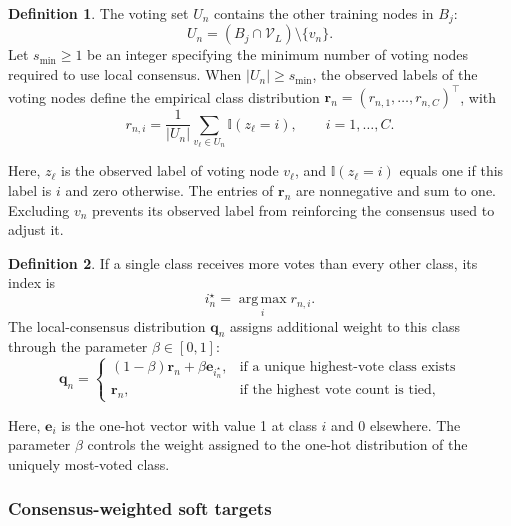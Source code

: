 \documentclass[times,review,10pt]{elsarticle}
\theoremstyle{definition}
\newtheorem{definition}{Definition}
\theoremstyle{plain}
\begin{document}
\begin{definition}
The voting set \(U_n\) contains the other training nodes in \(B_j\):
\begin{equation}\label{eq:7}
U_n=(B_j\cap\mathcal V_L)\setminus\{v_n\}.
\end{equation}
Let \(s_{\min}\geq1\) be an integer specifying the minimum number of voting nodes required to use local consensus. When \(|U_n|\geq s_{\min}\), the observed labels of the voting nodes define the empirical class distribution \(\mathbf r_n=(r_{n,1},\ldots,r_{n,C})^\top\), with
\begin{equation}\label{eq:8}
r_{n,i}=\frac{1}{|U_n|}\sum_{v_\ell\in U_n}\mathbb I(z_\ell=i),
\qquad i=1,\ldots,C.
\end{equation}
\end{definition}

Here, \(z_\ell\) is the observed label of voting node \(v_\ell\), and \(\mathbb I(z_\ell=i)\) equals one if this label is \(i\) and zero otherwise. The entries of \(\mathbf r_n\) are nonnegative and sum to one. Excluding \(v_n\) prevents its observed label from reinforcing the consensus used to adjust it.

\begin{definition}
If a single class receives more votes than every other class, its index is
\begin{equation}\label{eq:9}
i_n^\star=\operatorname*{arg\,max}_i r_{n,i}.
\end{equation}
The local-consensus distribution \(\mathbf q_n\) assigns additional weight to this class through the parameter \(\beta\in[0,1]\):
\begin{equation}\label{eq:10}
\mathbf q_n=
\begin{cases}
(1-\beta)\mathbf r_n+\beta\mathbf e_{i_n^\star},&\text{if a unique highest-vote class exists}\\
\mathbf r_n,&\text{if the highest vote count is tied},
\end{cases}
\end{equation}
\end{definition}

Here, \(\mathbf e_i\) is the one-hot vector with value 1 at class \(i\) and 0 elsewhere. The parameter \(\beta\) controls the weight assigned to the one-hot distribution of the uniquely most-voted class.

\subsubsection{Consensus-weighted soft targets}\label{sec:3.3.2}
\end{document}
